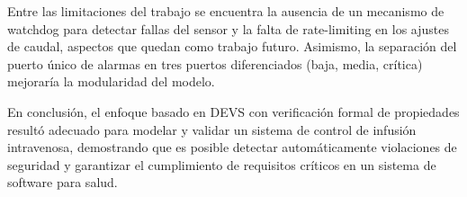 \documentclass[12pt,a4paper]{article}
\begin{document}
Entre las limitaciones del trabajo se encuentra la ausencia de un
mecanismo de watchdog para detectar fallas del sensor y la falta de
rate-limiting en los ajustes de caudal, aspectos que quedan como
trabajo futuro.  Asimismo, la separación del puerto único de alarmas
en tres puertos diferenciados (baja, media, crítica) mejoraría la
modularidad del modelo.

En conclusión, el enfoque basado en DEVS con verificación formal de
propiedades resultó adecuado para modelar y validar un sistema de
control de infusión intravenosa, demostrando que es posible detectar
automáticamente violaciones de seguridad y garantizar el cumplimiento
de requisitos críticos en un sistema de software para salud.
\end{document}
